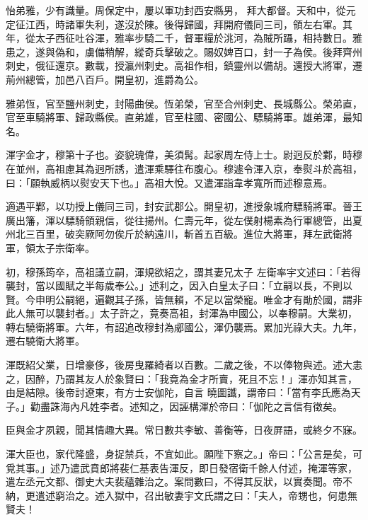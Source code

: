 \begin{pinyinscope}
 怡弟雅，少有識量。周保定中，屢以軍功封西安縣男，
 拜大都督。天和中，從元定征江西，時諸軍失利，遂沒於陳。後得歸國，拜開府儀同三司，領左右軍。其年，從太子西征吐谷渾，雅率步騎二千，督軍糧於洮河，為賊所躡，相持數日。雅患之，遂與偽和，虜備稍解，縱奇兵擊破之。賜奴婢百口，封一子為侯。後拜齊州刺史，俄征還京。數載，授瀛州刺史。高祖作相，鎮靈州以備胡。還授大將軍，遷荊州總管，加邑八百戶。開皇初，進爵為公。



 雅弟恆，官至鹽州刺史，封陽曲侯。恆弟榮，官至合州刺史、長城縣公。榮弟直，官至車騎將軍、歸政縣侯。直弟雄，官至柱國、密國公、驃騎將軍。雄弟渾，最知名。



 渾字金才，穆第十子也。姿貌瑰偉，美須髯。起家周左侍上士。尉迥反於鄴，時穆在並州，高祖慮其為迥所誘，遣渾乘驛往布腹心。穆遽令渾入京，奉熨斗於高祖，曰：「願執威柄以熨安天下也。」高祖大悅。又遣渾詣韋孝寬所而述穆意焉。



 適遇平鄴，以功授上儀同三司，封安武郡公。開皇初，進授象城府驃騎將軍。晉王廣出籓，渾以驃騎領親信，從往揚州。仁壽元年，從左僕射楊素為行軍總管，出夏州北三百里，破突厥阿勿俟斤於納遠川，斬首五百級。進位大將軍，拜左武衛將軍，領太子宗衛率。



 初，穆孫筠卒，高祖議立嗣，渾規欲紹之，謂其妻兄太子
 左衛率宇文述曰：「若得襲封，當以國賦之半每歲奉公。」述利之，因入白皇太子曰：「立嗣以長，不則以賢。今申明公嗣絕，遍觀其子孫，皆無賴，不足以當榮寵。唯金才有勛於國，謂非此人無可以襲封者。」太子許之，竟奏高祖，封渾為申國公，以奉穆嗣。大業初，轉右驍衛將軍。六年，有詔追改穆封為郕國公，渾仍襲焉。累加光祿大夫。九年，遷右驍衛大將軍。



 渾既紹父業，日增豪侈，後房曳羅綺者以百數。二歲之後，不以俸物與述。述大恚之，因醉，乃謂其友人於象賢曰：「我竟為金才所賣，死且不忘！」渾亦知其言，由是結隙。後帝討遼東，有方士安伽陀，自言
 曉圖讖，謂帝曰：「當有李氏應為天子。」勸盡誅海內凡姓李者。述知之，因誣構渾於帝曰：「伽陀之言信有徵矣。



 臣與金才夙親，聞其情趣大異。常日數共李敏、善衡等，日夜屏語，或終夕不寐。



 渾大臣也，家代隆盛，身捉禁兵，不宜如此。願陛下察之。」帝曰：「公言是矣，可覓其事。」述乃遣武賁郎將裴仁基表告渾反，即日發宿衛千餘人付述，掩渾等家，遣左丞元文都、御史大夫裴蘊雜治之。案問數曰，不得其反狀，以實奏聞。帝不納，更遣述窮治之。述入獄中，召出敏妻宇文氏謂之曰：「夫人，帝甥也，何患無賢夫！




\end{pinyinscope}
